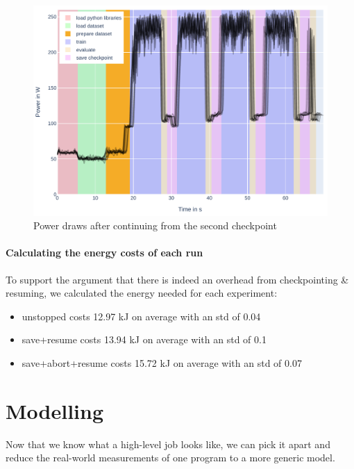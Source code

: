 \begin{figure}
    \includegraphics[width=\linewidth]{power-measurements/stacked_plots/roberta_continue_after_not_saving.pdf}
    \caption{Power draws after continuing from the second checkpoint}
    \label{fig:plot_partial_abort_continue_stacked}
\end{figure}

\paragraph{Calculating the energy costs of each run}

To support the argument that there is indeed an overhead from checkpointing \& resuming, we calculated the energy needed for each experiment:

\begin{itemize}
    \item  unstopped costs 12.97 kJ on average with an std of 0.04
    \item  save+resume costs 13.94 kJ on average with an std of 0.1
    \item  save+abort+resume costs 15.72 kJ on average with an std of 0.07
\end{itemize}

\section{Modelling}

Now that we know what a high-level job looks like, we can pick it apart and reduce the real-world measurements of one program to a more generic model. 

